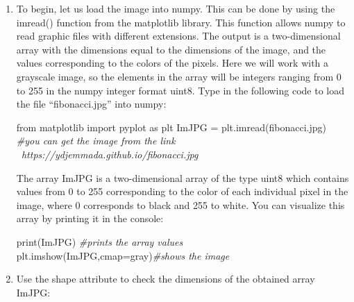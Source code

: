 \documentclass[11pt]{article}
\newenvironment{Shaded}{}{}
\newcommand{\StringTok}[1]{\textcolor[rgb]{0.25,0.44,0.63}{{#1}}}
\newcommand{\CommentTok}[1]{\textcolor[rgb]{0.38,0.63,0.69}{\textit{{#1}}}}
\newcommand{\NormalTok}[1]{{#1}}
\newcommand{\ImportTok}[1]{{#1}}
\newcommand{\OperatorTok}[1]{\textcolor[rgb]{0.40,0.40,0.40}{{#1}}}
\newcommand{\BuiltInTok}[1]{{#1}}
\begin{document}
\begin{enumerate}
\def\labelenumi{\arabic{enumi}.}
\item
  To begin, let us load the image into numpy. This can be done by using
  the imread() function from the matplotlib library. This function
  allows numpy to read graphic files with different extensions. The
  output is a two-dimensional array with the dimensions equal to the
  dimensions of the image, and the values corresponding to the colors of
  the pixels. Here we will work with a grayscale image, so the elements
  in the array will be integers ranging from 0 to 255 in the numpy
  integer format uint8. Type in the following code to load the file
  ``fibonacci.jpg'' into numpy:

\begin{Shaded}
\begin{tcolorbox}[breakable, size=fbox, boxrule=1pt, pad at break*=1mm,colback=cellbackground, colframe=cellborder]
  \begin{Highlighting}[]
\ImportTok{from}\NormalTok{ matplotlib }\ImportTok{import}\NormalTok{ pyplot }\ImportTok{as}\NormalTok{ plt}
\NormalTok{ImJPG }\OperatorTok{=}\NormalTok{ plt.imread(}\StringTok{\textquotesingle{}fibonacci.jpg\textquotesingle{}}\NormalTok{)}
\CommentTok{\#you can get the image from the link}
\CommentTok{\  https://ydjemmada.github.io/fibonacci.jpg}
\end{Highlighting}
\end{tcolorbox}
\end{Shaded}

  The array ImJPG is a two-dimensional array of the type uint8 which
  contains values from 0 to 255 corresponding to the color of each
  individual pixel in the image, where 0 corresponds to black and 255 to
  white. You can visualize this array by printing it in the console:

\begin{Shaded}
\begin{tcolorbox}[breakable, size=fbox, boxrule=1pt, pad at break*=1mm,colback=cellbackground, colframe=cellborder]
  \begin{Highlighting}[]
\BuiltInTok{print}\NormalTok{(ImJPG) }\CommentTok{\#prints the array values}
\NormalTok{plt.imshow(ImJPG,cmap}\OperatorTok{=}\StringTok{\textquotesingle{}gray\textquotesingle{}}\NormalTok{)}\CommentTok{\#shows the image}
\end{Highlighting}
\end{tcolorbox}
\end{Shaded}
\item
  Use the shape attribute to check the dimensions of the obtained array
  ImJPG:


\end{enumerate}
\end{document}
